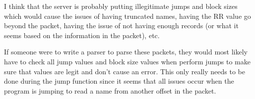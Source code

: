 \documentclass[12pt]{article}
\begin{document}
I think that the server is probably putting illegitimate jumps and block sizes which would cause the issues of having truncated names, having the RR value go beyond the packet, having the issue of not having enough records (or what it seems based on the information in the packet), etc. 

If someone were to write a parser to parse these packets, they would most likely have to check all jump values and block size values when perform jumps to make sure that values are legit and don't cause an error. This only really needs to be done during the jump function since it seems that all issues occur when the program is jumping to read a name from another offset in the packet. 
\end{document}
